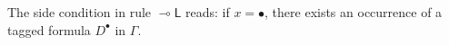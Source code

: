 \documentclass[copyright,creativecommons]{eptcs}
\theoremstyle{definition}
\newcommand{\lleft}{{\multimap}\mathsf{L}}
\newcommand{\RI}{\mathsf{RI}}
\newcommand{\Pass}{\mathsf{P}}
\newcommand{\F}{\mathsf{F}}
\begin{document}
The side condition in rule $\lleft$ reads: if $x = \bullet$, there exists an occurrence of a tagged formula $D^\bullet$ in $\Gamma$.

\end{document}
